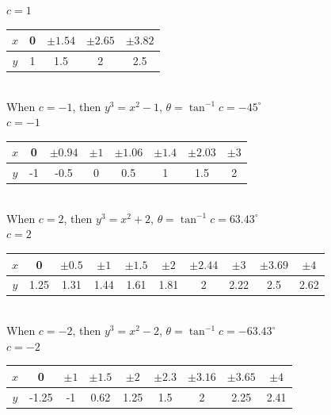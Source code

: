 \documentclass[../main-sheet.tex]{subfiles}
\begin{document}
\begin{soln}[b]
    \(c=1\) \begin{tabular}{|c|c|c|c|c|}
        \hline
        \(x\) & 0& \(\pm 1.54\) & \(\pm 2.65\) & \(\pm 3.82\)\\\hline
        \(y\) & 1& 1.5 & 2 & 2.5 \\\hline
    \end{tabular}\\
    When \(c=-1\), then \(y^3=x^2-1\), \(\theta=\tan^{-1}c=-45^{\circ}\)\\
    \(c=-1\) \begin{tabular}{|c|c|c|c|c|c|c|c|}
        \hline
        \(x\) & 0& \(\pm 0.94\) & \(\pm 1\) & \(\pm 1.06\)& \(\pm 1.4\)& \(\pm 2.03\)& \(\pm 3\)\\\hline
        \(y\) & -1& -0.5 & 0 & 0.5&1&1.5&2 \\\hline
    \end{tabular}\\
    When \(c=2\), then \(y^3=x^2+2\), \(\theta=\tan^{-1}c=63.43^{\circ}\)\\
    \(c=2\) \begin{tabular}{|c|c|c|c|c|c|c|c|c|c|}
        \hline
        \(x\) & 0& \(\pm 0.5\) & \(\pm 1\) & \(\pm 1.5\)& \(\pm 2\)& \(\pm 2.44\)& \(\pm 3\)&\(\pm 3.69\)&\(\pm 4\)\\\hline
        \(y\) & 1.25& 1.31 & 1.44 & 1.61&1.81&2&2.22&2.5&2.62 \\\hline
    \end{tabular}\\
    When \(c=-2\), then \(y^3=x^2-2\), \(\theta=\tan^{-1}c=-63.43^{\circ}\)\\
    \(c=-2\) \begin{tabular}{|c|c|c|c|c|c|c|c|c|}
        \hline
        \(x\) & 0& \(\pm 1\) & \(\pm 1.5\) & \(\pm 2\)& \(\pm 2.3\)& \(\pm 3.16\)& \(\pm 3.65\)&\(\pm 4\)\\\hline
        \(y\) & -1.25& -1 & 0.62 & 1.25&1.5&2&2.25&2.41 \\\hline
    \end{tabular}\\

\end{soln}
\end{document}
